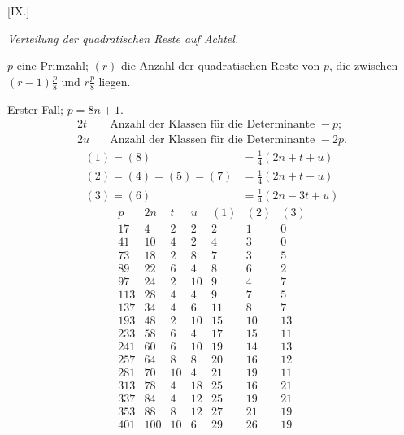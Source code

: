 \clearpage
{}
\par\bigskip{}\centerline{[IX.]}\medskip
\begin{center}\emph{Verteilung der quadratischen Reste auf Achtel.}\end{center}
$p$ eine Primzahl; $(r)$ die Anzahl der quadratischen Reste von $p$, die zwischen $(r-1)\frac p8$ und $r\frac p8$ liegen.

Erster Fall; $p=8n+1$.
\[
\begin{aligned}
2t&\quad\text{Anzahl der Klassen für die Determinante }-p;\\
2u&\quad\text{Anzahl der Klassen für die Determinante }-2p.
\end{aligned}
\]
\[
\begin{aligned}
(1)=(8)&=\tfrac14(2n+t+u)\\
(2)=(4)=(5)=(7)&=\tfrac14(2n+t-u)\\
(3)=(6)&=\tfrac14(2n-3t+u)
\end{aligned}
\]
\[
\begin{array}{r|r|r|r|r|r|r}
p&2n&t&u&(1)&(2)&(3)\\\hline
17&4&2&2&2&1&0\\
41&10&4&2&4&3&0\\
73&18&2&8&7&3&5\\
89&22&6&4&8&6&2\\
97&24&2&10&9&4&7\\
113&28&4&4&9&7&5\\
137&34&4&6&11&8&7\\
193&48&2&10&15&10&13\\
233&58&6&4&17&15&11\\
241&60&6&10&19&14&13\\
257&64&8&8&20&16&12\\
281&70&10&4&21&19&11\\
313&78&4&18&25&16&21\\
337&84&4&12&25&19&21\\
353&88&8&12&27&21&19\\
401&100&10&6&29&26&19
\end{array}
\]

